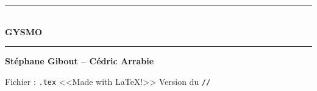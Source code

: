 \documentclass[11pt,fleqn,french]{book} %
\begin{document}
\let\cleardoublepage\clearpage


\begin{titlepage}

\begin{center}
\end{center}
\begin{center}
\rule[1em]{0.9\textwidth}{1mm}%
\Huge\scshape\bfseries
%
\\
GYSMO\\
\rule{0.9\textwidth}{1mm}
\end{center}

\begin{center}
\LARGE\bfseries
Stéphane Gibout -- Cédric Arrabie
\end{center}
{
\small
Fichier : \texttt{\jobname.tex}
\hfill
<<Made with \LaTeX !>>
\hfill
Version du  \texttt{\number\day/\number\month/\number\year}
}




\end{titlepage}


\end{document}

